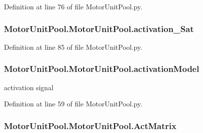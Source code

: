 Definition at line 76 of file Motor\-Unit\-Pool.\-py.

\hypertarget{class_motor_unit_pool_1_1_motor_unit_pool_ac475d1369c38d0bc5064c7243b4e1d44}{
\subsubsection[{activation\-\_\-\-Sat}]{\setlength{\rightskip}{0pt plus 5cm}Motor\-Unit\-Pool.\-Motor\-Unit\-Pool.\-activation\-\_\-\-Sat}}\label{class_motor_unit_pool_1_1_motor_unit_pool_ac475d1369c38d0bc5064c7243b4e1d44}


Definition at line 85 of file Motor\-Unit\-Pool.\-py.

\hypertarget{class_motor_unit_pool_1_1_motor_unit_pool_abaa7680d0691fac81f66b200dfcfd203}{
\subsubsection[{activation\-Model}]{\setlength{\rightskip}{0pt plus 5cm}Motor\-Unit\-Pool.\-Motor\-Unit\-Pool.\-activation\-Model}}\label{class_motor_unit_pool_1_1_motor_unit_pool_abaa7680d0691fac81f66b200dfcfd203}


activation signal 



Definition at line 59 of file Motor\-Unit\-Pool.\-py.

\hypertarget{class_motor_unit_pool_1_1_motor_unit_pool_ad03b9e215e833188060e90bc4392d42b}{
\subsubsection[{Act\-Matrix}]{\setlength{\rightskip}{0pt plus 5cm}Motor\-Unit\-Pool.\-Motor\-Unit\-Pool.\-Act\-Matrix}}\label{class_motor_unit_pool_1_1_motor_unit_pool_ad03b9e215e833188060e90bc4392d42b}


